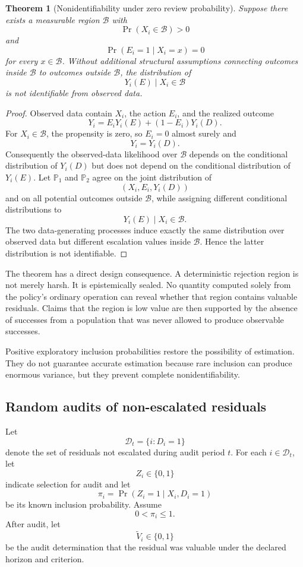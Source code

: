 \documentclass[11pt]{article}
\newtheorem{theorem}[definition]{Theorem}
\theoremstyle{definition}
\DeclareMathOperator{\Prob}{Pr}
\begin{document}
\begin{theorem}[Nonidentifiability under zero review probability]
Suppose there exists a measurable region \(\mathcal{B}\) with
\[
\Prob(X_i\in\mathcal{B})>0
\]
and
\[
\Prob(E_i=1\mid X_i=x)=0
\]
for every \(x\in\mathcal{B}\). Without additional structural assumptions connecting outcomes inside \(\mathcal{B}\) to outcomes outside \(\mathcal{B}\), the distribution of
\[
Y_i(E)\mid X_i\in\mathcal{B}
\]
is not identifiable from observed data.
\end{theorem}

\begin{proof}
Observed data contain \(X_i\), the action \(E_i\), and the realized outcome
\[
Y_i=E_iY_i(E)+(1-E_i)Y_i(D).
\]
For \(X_i\in\mathcal{B}\), the propensity is zero, so \(E_i=0\) almost surely and
\[
Y_i=Y_i(D).
\]
Consequently the observed-data likelihood over \(\mathcal{B}\) depends on the conditional distribution of \(Y_i(D)\) but does not depend on the conditional distribution of \(Y_i(E)\). Let \(\mathbb{P}_1\) and \(\mathbb{P}_2\) agree on the joint distribution of
\[
(X_i,E_i,Y_i(D))
\]
and on all potential outcomes outside \(\mathcal{B}\), while assigning different conditional distributions to
\[
Y_i(E)\mid X_i\in\mathcal{B}.
\]
The two data-generating processes induce exactly the same distribution over observed data but different escalation values inside \(\mathcal{B}\). Hence the latter distribution is not identifiable.
\end{proof}

The theorem has a direct design consequence. A deterministic rejection region is not merely harsh. It is epistemically sealed. No quantity computed solely from the policy's ordinary operation can reveal whether that region contains valuable residuals. Claims that the region is low value are then supported by the absence of successes from a population that was never allowed to produce observable successes.

Positive exploratory inclusion probabilities restore the possibility of estimation. They do not guarantee accurate estimation because rare inclusion can produce enormous variance, but they prevent complete nonidentifiability.

\subsection{Random audits of non-escalated residuals}

Let
\[
\mathcal{D}_t
=
\{i:D_i=1\}
\]
denote the set of residuals not escalated during audit period \(t\). For each \(i\in\mathcal{D}_t\), let
\[
Z_i\in\{0,1\}
\]
indicate selection for audit and let
\[
\pi_i
=
\Prob(Z_i=1\mid X_i,D_i=1)
\]
be its known inclusion probability. Assume
\[
0<\pi_i\leq1.
\]
After audit, let
\[
\widetilde{V}_i\in\{0,1\}
\]
be the audit determination that the residual was valuable under the declared horizon and criterion.
\end{document}

